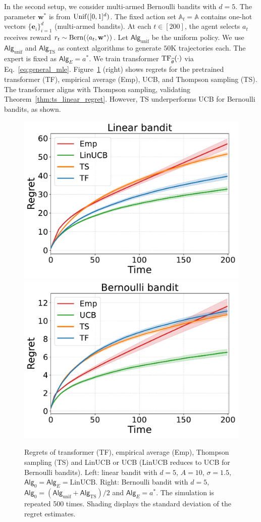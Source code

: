 \documentclass[10pt]{article}
\newcommand{\<}{\left\langle}
\renewcommand{\>}{\right\rangle}
\newcommand{\TF}{{\rm TF}}
\newcommand{\LinUCB}{{\mathrm{LinUCB}}}
\newcommand{\TS}{{\mathrm{TS}}}
\newcommand{\action}{{a}}
\newcommand{\sAlg}{{\mathsf{Alg}}}
\newcommand{\EstPar}{{\widehat{\theta}}}
\newcommand{\shortexp}{{E}}
\def\sA{{\mathbb{A}}}
\def\be{{\mathbf e}}
\def\bw{{\mathbf w}}
\begin{document}
In the second setup, we consider multi-armed Bernoulli bandits with $d = 5$. The parameter $\bw^*$ is from ${\rm Unif}([0,1]^d)$. The fixed action set $\sA_t=\sA$ contains one-hot vectors $\{\be_i\}_{i=1}^d$ (multi-armed bandits). At each $t \in [200]$, the agent selects $\action_t$ receives reward $r_t \sim {\rm Bern}(\<\action_t,\bw^*\>)$. Let $\sAlg_{\mathrm{unif}}$ be the uniform policy. We use $\sAlg_{\mathrm{unif}}$ and $\sAlg_\TS$ as context algorithms to generate $50$K trajectories each. The expert is fixed as $\sAlg_\shortexp=\action^*$. We train transformer $\TF_\EstPar(\cdot)$ via Eq.~\eqref{eq:general_mle}. Figure~\ref{fig:regret_1} (right) shows regrets for the pretrained transformer (TF), empirical average (Emp), UCB, and Thompson sampling (TS).  The transformer aligns with Thompson sampling, validating Theorem~\ref{thm:ts_linear_regret}. However, TS underperforms UCB for Bernoulli bandits, as shown. 






\begin{figure}[t]
\centering  
\includegraphics[width=0.35\linewidth]{Sections/figs/record_2_cum_True.pdf}
\hspace{2em}
\includegraphics[width=0.35\linewidth]{Sections/figs/record_1_cum_True.pdf}
\vspace{-1em}
\caption{Regrets of transformer (TF), empirical average (Emp), Thompson sampling (TS) and LinUCB or UCB (LinUCB reduces to UCB for Bernoulli bandits). Left: linear bandit with $d=5$, $A=10$, $\sigma=1.5$, $\sAlg_0=\sAlg_\shortexp=\LinUCB$. Right: Bernoulli bandit with $d=5$, $\sAlg_0=(\sAlg_{\mathrm{unif}}+\sAlg_{\TS})/2$ and $\sAlg_\shortexp=\action^*$. The simulation is repeated 500 times. Shading displays the standard deviation of the regret estimates. } 
\label{fig:regret_1} 
\end{figure}
\end{document}
